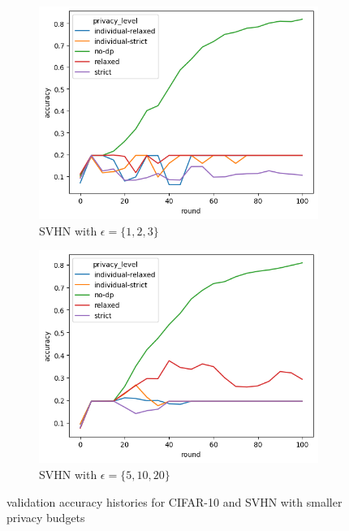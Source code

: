 \begin{figure}
\begin{subfigure}{0.4\textwidth}
		\includegraphics[width=\linewidth]{Bilder/svhn-accuracy-eps-1-2-3.png}
		\caption{SVHN with $\epsilon = \{1,2,3\}$}
	\end{subfigure}
	\begin{subfigure}{0.4\textwidth}
		\centering
		\includegraphics[width=\linewidth]{Bilder/svhn-accuracy-eps-5-10-20.png}
		\caption{SVHN with $\epsilon = \{5,10,20\}$}
	\end{subfigure}
	\caption{validation accuracy histories for CIFAR-10 and SVHN with smaller privacy budgets}
	\label{fig:cifar-svhn-small-budgets}
\end{figure}